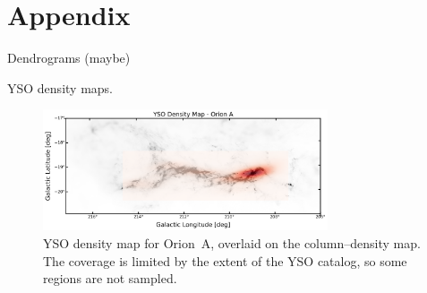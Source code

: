 \chapter{Appendix}

Dendrograms (maybe)

YSO density maps.
\begin{figure}[t]
    \centering
    \includegraphics[width=0.75\textwidth]{figures/YSOs_density_Orion_A.png}
    \caption{YSO density map for Orion~A, overlaid on the column--density map. The coverage is limited by the extent of the YSO catalog, so some regions are not sampled.}
    \label{fig:YSOs_density_Map_A}
\end{figure}


